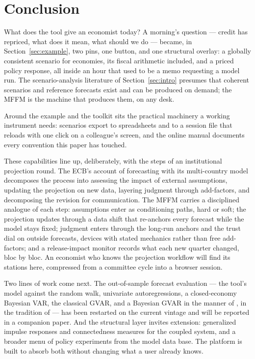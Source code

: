\documentclass[11pt]{article}
\begin{document}
\section{Conclusion}\label{sec:conclusion}

What does the tool give an economist today? A morning's question --- credit has repriced,
what does it mean, what should we do --- became, in Section~\ref{sec:example}, two pins, one
button, and one structural overlay: a globally consistent scenario for \NModels{} economies,
its fiscal arithmetic included, and a priced policy response, all inside an hour that used to
be a memo requesting a model run. The scenario-analysis literature of
Section~\ref{sec:intro} presumes that coherent scenarios and reference forecasts exist and
can be produced on demand; the MFFM is the machine that produces them, on any desk.

Around the example and the toolkit sits the practical machinery a working instrument needs:
scenarios export to spreadsheets and to a session file that reloads with one click on a
colleague's screen, and the online manual documents every convention this paper has touched.

These capabilities line up, deliberately, with the steps of an institutional projection
round. The ECB's account of forecasting with its multi-country model
\citep{AngeliniBokanCiccarelliLalikZimic2025} decomposes the process into assessing the
impact of external assumptions, updating the projection on new data, layering judgment
through add-factors, and decomposing the revision for communication. The MFFM carries a
disciplined analogue of each step: assumptions enter as conditioning paths, hard or soft;
the projection updates through a data shift that re-anchors every forecast while the model
stays fixed; judgment enters through the long-run anchors and the trust dial on outside
forecasts, devices with stated mechanics rather than free add-factors; and a release-impact
monitor records what each new quarter changed, bloc by bloc. An economist who knows the
projection workflow will find its stations here, compressed from a committee cycle into a
browser session.

Two lines of work come next. The out-of-sample forecast evaluation --- the tool's model
against the random walk, univariate autoregressions, a closed-economy Bayesian VAR, the
classical GVAR, and a Bayesian GVAR in the manner of \citet{CrespoFeldkircherHuber2016}, in the
tradition of \citet{AdolfsonLindeVillani2007} --- has been restarted
on the current vintage and will be reported in a companion paper. And the structural layer
invites extension: generalized impulse responses and connectedness measures for the coupled
system, and a broader menu of policy experiments from the model data base. The platform is
built to absorb both without changing what a user already knows.
\end{document}
